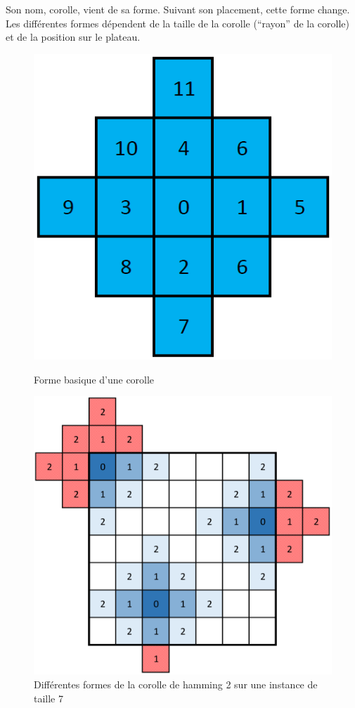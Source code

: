	Son nom, corolle, vient de sa forme. Suivant son placement, cette forme change. Les différentes formes dépendent de la taille de la corolle (\enquote{rayon} de la corolle) et de la position sur le plateau.
		
	\begin{figure}[H]
		\begin{minipage}[t]{0.33\textwidth}
			\includegraphics[width=\linewidth]{images/corolle_simple.png}
			\caption{Forme basique d'une corolle}\label{fig:corolle}
		\end{minipage}\hfill
		\begin{minipage}[t]{0.66\textwidth}
			\includegraphics[width=\linewidth]{images/corolle_formes.png}
			\caption{Différentes formes de la corolle de hamming 2 sur une instance de taille 7}\label{fig:corolle_forme}
		\end{minipage}\hfill
	\end{figure}
	
